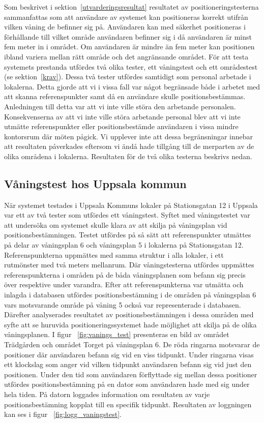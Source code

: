 \documentclass[a4paper,12pt]{article}
\begin{document}
 Som beskrivet i sektion~\ref{utvarderingsresultat} resultatet av positioneringstesterna sammanfattas som att användare av systemet kan positioneras korrekt utifrån vilken våning de befinner sig på. Användaren kan med säkerhet positioneras i förhållande till vilket område användaren befinner sig i då användaren är minst fem meter in i området. Om användaren är mindre än fem meter kan positionen ibland variera mellan rätt område och det angränsande området.
 För att testa systemets prestanda utfördes två olika tester, ett våningstest och ett områdestest (se sektion~\ref{krav}). Dessa två tester utfördes samtidigt som personal arbetade i lokalerna. Detta gjorde att vi i vissa fall var något begränsade både i arbetet med att skanna referenspunkter samt då en användare skulle positionsbestämmas. Anledningen till detta var att vi inte ville störa den arbetande personalen. Konsekvenserna av att vi inte ville störa arbetande personal blev att vi inte utmätte referenspunkter eller positionsbestämde användaren i vissa mindre kontorsrum där möten pågick. Vi upplever inte att dessa begränsningar innebar att resultaten påverkades eftersom vi ändå hade tillgång till de merparten av de olika områdena i lokalerna. Resultaten för de två olika testerna beskrivs nedan.


 \subsection{Våningstest hos Uppsala kommun}\label{vaningstest}
 När systemet testades i Uppsala Kommuns lokaler på Stationsgatan 12 i Uppsala var ett av två tester som utfördes ett våningstest. Syftet med våningstestet var att undersöka om systemet skulle klara av att skilja på våningsplan vid positionsbestämningen. Testet utfördes på så sätt att referenspunkter utmättes på delar av våningsplan 6 och våningsplan 5 i lokalerna på Stationsgatan 12. Referenspunkterna uppmättes med samma struktur i alla lokaler, i ett rutmönster med två meters mellanrum. Där våningstesterna utfördes uppmättes referenspunkterna i områden på de båda våningsplanen som befann sig precis över respektive under varandra. Efter att referenspunkterna var utmätta och inlagda i databasen utfördes positionsbestämning i de områden på våningsplan 6 vars motsvarande område på våning 5 också var representerade i databasen. Därefter analyserades resultatet av positionsbestämningen i dessa områden med syfte att se huruvida positioneringssystemet hade möjlighet att skilja på de olika våningsplanen. I figur ~\ref{fig:vanings_test} presenteras en bild av området Trädgården och området Torget på våningsplan 6. De röda ringarna motsvarar de positioner där användaren befann sig vid en viss tidpunkt. Under ringarna visas ett klockslag som anger vid vilken tidpunkt användaren befann sig vid just den positionen. Under den tid som användaren förflyttade sig mellan dessa positioner utfördes positionsbestämning på en dator som användaren hade med sig under hela tiden. På datorn loggades information om resultaten av varje positionsbestämning kopplat till en specifik tidpunkt. Resultaten av loggningen kan ses i figur ~\ref{fig:logg_vaningstest}.
\end{document}
